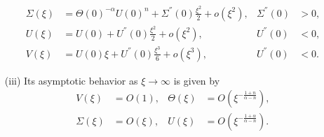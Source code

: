 \documentclass[graybox]{svmult}
\begin{document}
\begin{theorem}
\begin{enumerate}
\begin{equation}
\begin{aligned}
    \Sigma(\xi) &= \Theta(0)^{-\alpha}{U(0)^n}+ \Sigma^{''}(0)\frac{\xi^2}{2} + o(\xi^2), & \Sigma^{''}(0)&>0, \\
    U(\xi) &= U(0) + U^{''}(0)\frac{\xi^2}{2} + o(\xi^2), & U^{''}(0)&<0,\\
    V(\xi) &= U(0)\xi + U^{''}(0)\frac{\xi^3}{6} + o(\xi^3), & U^{''}(0)&<0.
  \end{aligned}
  \end{equation}
  \item[(iii)] Its asymptotic behavior as $\xi \rightarrow \infty$ is given by
  \begin{equation} \label{eq:ss_asymp1}
  \begin{aligned}
    V(\xi) &= O(1), &    \Theta(\xi) &= O(\xi^{-\frac{1+n}{\alpha-n}}),\\
   \Sigma(\xi) &= O(\xi), &   U(\xi) &= O(\xi^{-\frac{1+\alpha}{\alpha-n}}).
  \end{aligned}
  \end{equation}
 \end{enumerate}
\end{theorem}
\end{document}
